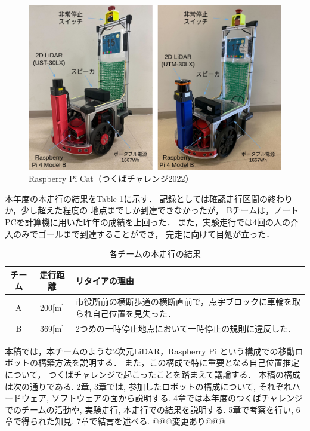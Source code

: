 \documentclass[twocolumn,9pt]{jsproceedings}
\begin{document}
\begin{figure}[h]
 	\begin{center}
 		\includegraphics[width=1.0\linewidth]{figs/raspicat.png}
 		\caption{Raspberry Pi Cat（つくばチャレンジ2022）}
 		\label{fig:raspicat}
 	\end{center}
\end{figure}

本年度の本走行の結果をTable \ref{MainRun}に示す．
記録としては確認走行区間の終わりか，少し超えた程度の
地点までしか到達できなかったが，
Bチームは，ノートPCを計算機に用いた昨年の成績を上回った．
また，実験走行では4回の人の介入のみでゴールまで到達することができ，
完走に向けて目処が立った．

\begin{table}[h]
  \caption{各チームの本走行の結果}
  \label{MainRun}
	\begin{tabular}{|c|c|p{5.4cm}|}
    \hline
	チーム & 走行距離 & リタイアの理由 \\
    \hline
	A & 200[m] & 市役所前の横断歩道の横断直前で，点字ブロックに車輪を取られ自己位置を見失った．\\
    \hline
	B & 369[m] & 2つめの一時停止地点において一時停止の規則に違反した. \\ 
    \hline
  \end{tabular}
\end{table}


本稿では，本チームのような2次元LiDAR，Raspberry Pi
という構成での移動ロボットの構築方法を説明する．
また，この構成で特に重要となる自己位置推定について，
つくばチャレンジで起こったことを踏まえて議論する．
本稿の構成は次の通りである. 
2章, 3章では, 参加したロボットの構成について, 
それぞれハードウェア, ソフトウェアの面から説明する. 
4章では本年度のつくばチャレンジでのチームの活動や, 
実験走行, 本走行での結果を説明する.
5章で考察を行い, 6章で得られた知見, 7章で結言を述べる. 
@@@変更あり@@@
\end{document}
